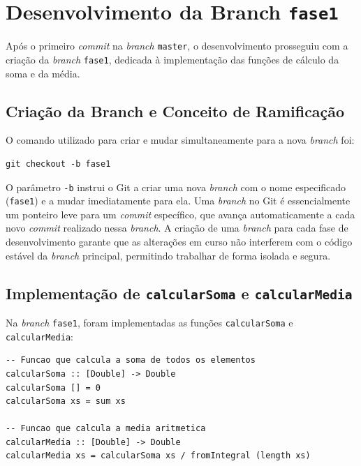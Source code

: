 \documentclass[12pt, a4paper, oneside]{report}
\begin{document}
\section{Desenvolvimento da Branch \texttt{fase1}}

Após o primeiro \textit{commit} na \textit{branch} \texttt{master}, o desenvolvimento prosseguiu com a criação da \textit{branch} \texttt{fase1}, dedicada à implementação das funções de cálculo da soma e da média.

\subsection{Criação da Branch e Conceito de Ramificação}

O comando utilizado para criar e mudar simultaneamente para a nova \textit{branch} foi:

\begin{lstlisting}[style=bash, caption={Criação da branch fase1}, label=lst:checkout-fase1]
git checkout -b fase1
\end{lstlisting}

{\sloppy O parâmetro \texttt{-b} instrui o Git a criar uma nova \textit{branch} com o nome especificado (\texttt{fase1}) e a mudar imediatamente para ela. Uma \textit{branch} no Git é essencialmente um ponteiro leve para um \textit{commit} específico, que avança automaticamente a cada novo \textit{commit} realizado nessa \textit{branch}. A criação de uma \textit{branch} para cada fase de desenvolvimento garante que as alterações em curso não interferem com o código estável da \textit{branch} principal, permitindo trabalhar de forma isolada e segura.}

\subsection{Implementação de \texttt{calcularSoma} e \texttt{calcularMedia}}

Na \textit{branch} \texttt{fase1}, foram implementadas as funções \texttt{calcularSoma} e \mbox{\texttt{calcularMedia}}:

\begin{lstlisting}[style=haskell, caption={Funções calcularSoma e calcularMedia -- branch fase1}, label=lst:fase1]
-- Funcao que calcula a soma de todos os elementos
calcularSoma :: [Double] -> Double
calcularSoma [] = 0
calcularSoma xs = sum xs

-- Funcao que calcula a media aritmetica
calcularMedia :: [Double] -> Double
calcularMedia xs = calcularSoma xs / fromIntegral (length xs)
\end{lstlisting}
\end{document}
